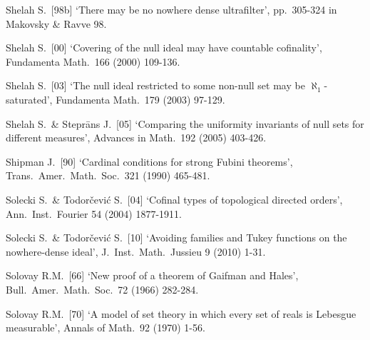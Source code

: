 {Shelah S.\ [98b] `There may be no nowhere dense ultrafilter', pp.\ 305-324
in {\smc Makovsky \& Ravve 98}.
\cmmnt{[538H, \S538 {\it notes\/}.]}


Shelah S.\ [00] `Covering of the null ideal may have countable
cofinality', Fundamenta Math.\ 166 (2000) 109-136.
\cmmnt{[\S522 {\it notes\/}.]}

Shelah S.\ [03] `The null ideal restricted to some non-null set may be
$\aleph_1$-saturated',  Fundamenta Math.\ 179 (2003) 97-129.
\cmmnt{[ \S548 {\it notes\/}.]}


Shelah S.\ \& Stepr\=ans J.\ [05]
`Comparing the uniformity invariants of null sets for different measures',
Advances in Math.\ 192 (2005) 403-426.
\cmmnt{[534Za.]}


Shipman J.\ [90] `Cardinal conditions for strong Fubini
theorems', Trans.\ Amer.\ Math.\ Soc.\ 321 (1990) 465-481.
\cmmnt{[537K.]}


Solecki S.\ \& Todor\v{c}evi\'c S.\ [04]
`Cofinal types of topological directed orders',
Ann.\ Inst.\ Fourier 54 (2004) 1877-1911.
\cmmnt{[513K, 513O, 513Yi.]}

Solecki S.\ \& Todor\v{c}evi\'c S.\ [10]
`Avoiding families and Tukey functions on the nowhere-dense ideal',
J.\ Inst.\ Math.\ Jussieu 9 (2010) 1-31.
\cmmnt{[526L.]}

Solovay R.M.\ [66] `New proof of a theorem of Gaifman and Hales',
Bull.\ Amer.\ Math.\ Soc.\ 72 (1966) 282-284.
\cmmnt{[514Xi.]}

Solovay R.M.\ [70] `A model of set theory in which every set of reals
is Lebesgue measurable', Annals of Math.\ 92 (1970) 1-56.
\cmmnt{[\S522 {\it notes\/}.]}

}
